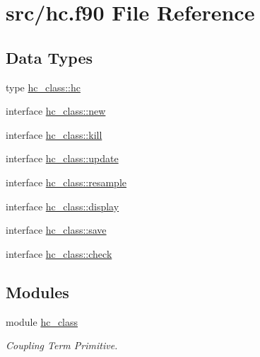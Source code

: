 \hypertarget{hc_8f90}{}\section{src/hc.f90 File Reference}
\label{hc_8f90}
\subsection*{Data Types}
\begin{DoxyCompactItemize}
\item 
type \hyperlink{structhc__class_1_1hc}{hc\+\_\+class\+::hc}
\item 
interface \hyperlink{interfacehc__class_1_1new}{hc\+\_\+class\+::new}
\item 
interface \hyperlink{interfacehc__class_1_1kill}{hc\+\_\+class\+::kill}
\item 
interface \hyperlink{interfacehc__class_1_1update}{hc\+\_\+class\+::update}
\item 
interface \hyperlink{interfacehc__class_1_1resample}{hc\+\_\+class\+::resample}
\item 
interface \hyperlink{interfacehc__class_1_1display}{hc\+\_\+class\+::display}
\item 
interface \hyperlink{interfacehc__class_1_1save}{hc\+\_\+class\+::save}
\item 
interface \hyperlink{interfacehc__class_1_1check}{hc\+\_\+class\+::check}
\end{DoxyCompactItemize}
\subsection*{Modules}
\begin{DoxyCompactItemize}
\item 
module \hyperlink{namespacehc__class}{hc\+\_\+class}
\begin{DoxyCompactList}\small\item\em Coupling Term Primitive. \end{DoxyCompactList}\end{DoxyCompactItemize}
